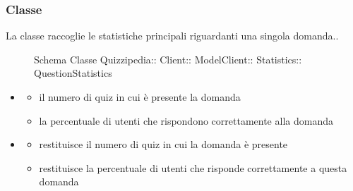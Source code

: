 \subsubsection{Classe }
La classe raccoglie le statistiche principali riguardanti una singola domanda..
\begin{figure}[H]
\centering
\noindent{}
\caption[Schema Classe QuestionStatistics]{Schema Classe Quizzipedia:: Client:: ModelClient:: Statistics:: QuestionStatistics}
\end{figure}
\begin{itemize}
\item {}
\begin{itemize}
\item {}
\newline
il numero di quiz in cui è presente la domanda
\item {}
\newline
la percentuale di utenti che rispondono correttamente alla domanda
\end{itemize}
\item {}
\begin{itemize}
\item {}
\newline
restituisce il numero di quiz in cui la domanda è presente
\newline
\item {}
\newline
restituisce la percentuale di utenti che risponde correttamente a questa domanda
\newline
\end{itemize}
\end{itemize}
